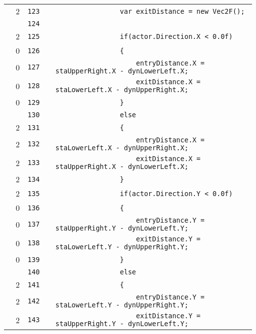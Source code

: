 \documentclass[a4paper,landscape,10pt]{article}
\begin{document}
\begin{longtable}[l]{lrrll}
\cellcolor{green} & 2 & \verb~123~ & & \verb~                var exitDistance = new Vec2F();~\\
\cellcolor{gray} &  & \verb~124~ & & \verb~~\\
\cellcolor{orange} & 2 & \verb~125~ & & \verb~                if(actor.Direction.X < 0.0f)~\\
\cellcolor{red} & 0 & \verb~126~ & & \verb~                {~\\
\cellcolor{red} & 0 & \verb~127~ & & \verb~                    entryDistance.X = staUpperRight.X - dynLowerLeft.X;~\\
\cellcolor{red} & 0 & \verb~128~ & & \verb~                    exitDistance.X = staLowerLeft.X - dynUpperRight.X;~\\
\cellcolor{red} & 0 & \verb~129~ & & \verb~                }~\\
\cellcolor{gray} &  & \verb~130~ & & \verb~                else~\\
\cellcolor{green} & 2 & \verb~131~ & & \verb~                {~\\
\cellcolor{green} & 2 & \verb~132~ & & \verb~                    entryDistance.X = staLowerLeft.X - dynUpperRight.X;~\\
\cellcolor{green} & 2 & \verb~133~ & & \verb~                    exitDistance.X = staUpperRight.X - dynLowerLeft.X;~\\
\cellcolor{green} & 2 & \verb~134~ & & \verb~                }~\\
\cellcolor{orange} & 2 & \verb~135~ & & \verb~                if(actor.Direction.Y < 0.0f)~\\
\cellcolor{red} & 0 & \verb~136~ & & \verb~                {~\\
\cellcolor{red} & 0 & \verb~137~ & & \verb~                    entryDistance.Y = staUpperRight.Y - dynLowerLeft.Y;~\\
\cellcolor{red} & 0 & \verb~138~ & & \verb~                    exitDistance.Y = staLowerLeft.Y - dynUpperRight.Y;~\\
\cellcolor{red} & 0 & \verb~139~ & & \verb~                }~\\
\cellcolor{gray} &  & \verb~140~ & & \verb~                else~\\
\cellcolor{green} & 2 & \verb~141~ & & \verb~                {~\\
\cellcolor{green} & 2 & \verb~142~ & & \verb~                    entryDistance.Y = staLowerLeft.Y - dynUpperRight.Y;~\\
\cellcolor{green} & 2 & \verb~143~ & & \verb~                    exitDistance.Y = staUpperRight.Y - dynLowerLeft.Y;~\\

\end{longtable}
\end{document}
